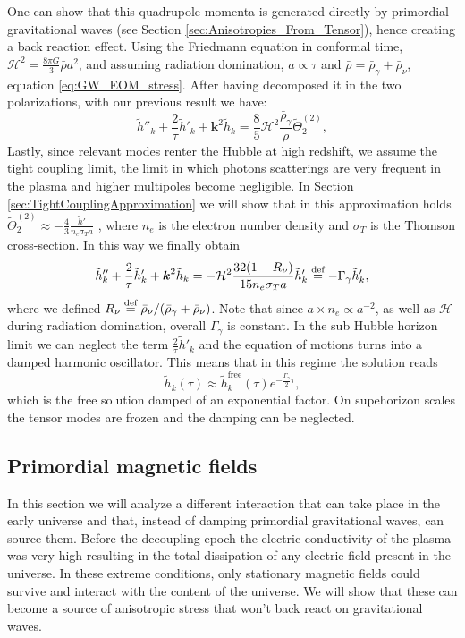 One can show that this quadrupole momenta is generated directly by primordial gravitational waves (see Section \ref{sec:Anisotropies_From_Tensor}), hence creating a back reaction effect. Using the Friedmann equation in conformal time, $\mathcal{H}^2=\tfrac{8\pi G}{3}\bar\rho a^2$, and assuming radiation domination, $a\propto \tau$ and $\bar\rho=\bar\rho_\gamma+\bar\rho_\nu$, equation \eqref{eq:GW_EOM_stress}. After having decomposed it in the two polarizations, with our previous result we have:
$$
    \tilde h''_{k}+\frac{2}{\tau}\tilde h'_{k}+\boldsymbol{k}^2 \tilde h_{k}=\frac{8}{5}\mathcal{H}^2\frac{\bar\rho_\gamma}{\bar\rho}\tilde\Theta_2^{(2)},
$$
Lastly, since relevant modes renter the Hubble at high redshift, we assume the tight coupling limit, the limit in which photons scatterings are very frequent in the plasma and higher multipoles become negligible. In Section \ref{sec:TightCouplingApproximation} we will show that in this approximation holds $\tilde\Theta^{(2)}_2\approx-\tfrac43\tfrac{\tilde h'}{n_e\sigma_T a}$ ,
where $n_e$ is the electron number density and $\sigma_T$ is the Thomson cross-section. In this way we finally obtain 
$$
    \tilde h''_{k}+\frac{2}{\tau}\tilde h'_{k}+\boldsymbol{k}^2 \tilde h_{k}=-\mathcal{H}^2\frac{32(1-R_\nu)}{15n_e\sigma_T a}\tilde h'_{k}\stackrel{\text{def}}{=} -\Gamma_\gamma \tilde h'_k,
$$
where we defined $R_\nu\stackrel{\text{def}}{=}\bar\rho_\nu/(\bar\rho_\gamma+\bar\rho_\nu)$. Note that since $a\times n_e\propto a^{-2}$, as well as $\mathcal{H}$ during radiation domination, overall $\Gamma_\gamma$ is constant. In the sub Hubble horizon limit we can neglect the term $\tfrac2\tau \tilde h'_k$ and the equation of motions turns into a damped harmonic oscillator. This means that in this regime the solution reads 
\begin{equation}
    \tilde h_k(\tau)\approx\tilde h_k^{\text{free}}(\tau)e^{-\frac{\Gamma_\gamma}{2}\tau},
\end{equation} 
which is the free solution damped of an exponential factor. On supehorizon scales the tensor modes are frozen and the damping can be neglected.
\subsection{Primordial magnetic fields}
In this section we will analyze a different interaction that can take place in the early universe and that, instead of damping primordial gravitational waves, can source them. Before the decoupling epoch the electric conductivity of the plasma was very high resulting in the total dissipation of any electric field present in the universe. In these extreme conditions, only stationary magnetic fields could survive and interact with the content of the universe. We will show that these can become a source of anisotropic stress that won't back react on gravitational waves.

